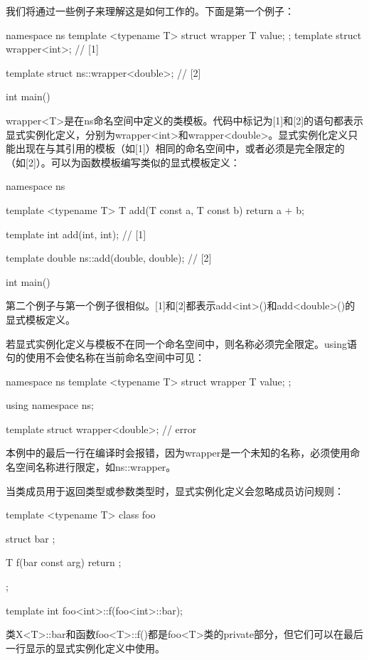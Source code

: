 我们将通过一些例子来理解这是如何工作的。下面是第一个例子：

\begin{cpp}
namespace ns
{
	template <typename T>
	struct wrapper
	{
		T value;
	};
	template struct wrapper<int>; // [1]
}

template struct ns::wrapper<double>; // [2]

int main() {}
\end{cpp}

wrapper<T>是在ns命名空间中定义的类模板。代码中标记为[1]和[2]的语句都表示显式实例化定义，分别为wrapper<int>和wrapper<double>。显式实例化定义只能出现在与其引用的模板（如[1]）相同的命名空间中，或者必须是完全限定的（如[2]）。可以为函数模板编写类似的显式模板定义：

\begin{cpp}
namespace ns
{
	template <typename T>
	T add(T const a, T const b)
	{
		return a + b;
	}

	template int add(int, int); // [1]
}

template double ns::add(double, double); // [2]

int main() { }
\end{cpp}

第二个例子与第一个例子很相似。[1]和[2]都表示add<int>()和add<double>()的显式模板定义。

若显式实例化定义与模板不在同一个命名空间中，则名称必须完全限定。using语句的使用不会使名称在当前命名空间中可见：

\begin{cpp}
namespace ns
{
	template <typename T>
	struct wrapper { T value; };
}

using namespace ns;

template struct wrapper<double>; // error
\end{cpp}

本例中的最后一行在编译时会报错，因为wrapper是一个未知的名称，必须使用命名空间名称进行限定，如ns::wrapper。

当类成员用于返回类型或参数类型时，显式实例化定义会忽略成员访问规则：

\begin{cpp}
template <typename T>
class foo
{
	struct bar {};
	
	T f(bar const arg)
	{
		return {};
	}
};

template int foo<int>::f(foo<int>::bar);
\end{cpp}

类X<T>::bar和函数foo<T>::f()都是foo<T>类的private部分，但它们可以在最后一行显示的显式实例化定义中使用。

